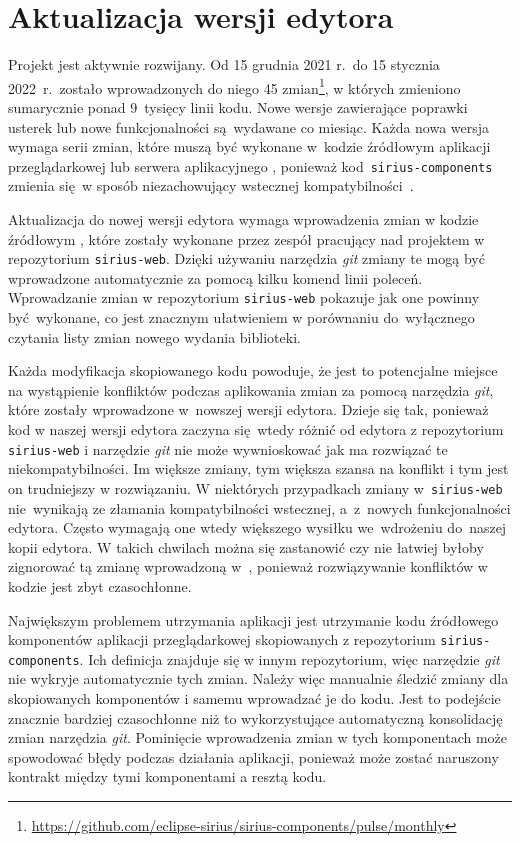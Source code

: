 \section{Aktualizacja wersji edytora}

Projekt \SiriusWeb{} jest aktywnie rozwijany. Od 15 grudnia 2021 r.\ do 15
stycznia 2022~r.\ zostało wprowadzonych do niego 45 zmian\footnote{
	\url{https://github.com/eclipse-sirius/sirius-components/pulse/monthly}
}, w których zmieniono sumarycznie ponad 9~tysięcy linii kodu.
Nowe wersje zawierające poprawki usterek lub nowe funkcjonalności są~wydawane
co miesiąc. Każda nowa wersja wymaga serii zmian, które muszą być wykonane
w~kodzie źródłowym aplikacji przeglądarkowej lub serwera aplikacyjnego
\SiriusWeb{}, ponieważ kod~\texttt{sirius-components} zmienia się w sposób
niezachowujący wstecznej kompatybilności~\cite{sirius-components-changelog}.

Aktualizacja do nowej wersji edytora wymaga wprowadzenia zmian w kodzie
źródłowym \SiriusWeb{}, które zostały wykonane przez zespół pracujący nad
projektem w repozytorium \texttt{sirius-web}. Dzięki używaniu narzędzia
\emph{git} zmiany te mogą być wprowadzone automatycznie za pomocą kilku komend
linii poleceń. Wprowadzanie zmian w repozytorium \texttt{sirius-web} pokazuje
jak one powinny być wykonane, co jest znacznym ułatwieniem w porównaniu
do~wyłącznego czytania listy zmian nowego wydania biblioteki.

Każda modyfikacja skopiowanego kodu \SiriusWeb{} powoduje, że jest to
potencjalne
miejsce na wystąpienie konfliktów podczas aplikowania zmian za pomocą narzędzia
\emph{git}, które zostały wprowadzone w~nowszej wersji edytora.
Dzieje się tak, ponieważ kod w naszej wersji edytora zaczyna się wtedy różnić
od edytora z repozytorium \texttt{sirius-web} i narzędzie \emph{git} nie może
wywnioskować jak ma rozwiązać te niekompatybilności.
Im większe zmiany, tym większa szansa na konflikt i tym jest on trudniejszy w
rozwiązaniu.
W niektórych przypadkach zmiany w~\texttt{sirius-web} nie~wynikają ze złamania
kompatybilności wstecznej, a~z~nowych funkcjonalności edytora. Często
wymagają one wtedy większego wysiłku we~wdrożeniu do~naszej kopii edytora.
W takich chwilach można się zastanowić czy nie łatwiej byłoby zignorować tą
zmianę wprowadzoną w~\SiriusWeb{}, ponieważ rozwiązywanie konfliktów w
kodzie jest zbyt czasochłonne.

Największym problemem utrzymania aplikacji \SiriusWeb{} jest utrzymanie
kodu źródłowego komponentów aplikacji przeglądarkowej skopiowanych z
repozytorium \texttt{sirius-components}. Ich definicja znajduje się w innym
repozytorium, więc narzędzie \emph{git} nie wykryje automatycznie tych zmian.
Należy więc manualnie śledzić zmiany dla skopiowanych komponentów i samemu
wprowadzać je do kodu. Jest to podejście znacznie bardziej czasochłonne
niż to wykorzystujące automatyczną konsolidację zmian narzędzia \emph{git}.
Pominięcie wprowadzenia zmian w tych komponentach może spowodować błędy podczas
działania aplikacji, ponieważ może zostać naruszony kontrakt między tymi
komponentami a resztą kodu.

